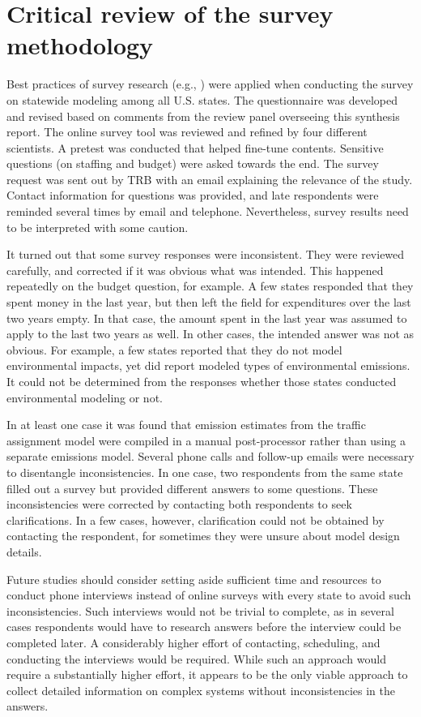 \section{Critical review of the survey methodology}\label{sec:survey-critical-review}

Best practices of survey research (e.g., \cite{babbie11}) were applied when conducting the survey on statewide modeling among all U.S. states. The questionnaire was developed and revised based on comments from the review panel overseeing this synthesis report. The online survey tool was reviewed and refined by four different scientists. A pretest was conducted that helped fine-tune contents. Sensitive questions (on staffing and budget) were asked towards the end. The survey request was sent out by TRB with an email explaining the relevance of the study. Contact information for questions was provided, and late respondents were reminded several times by email and telephone. Nevertheless, survey results need to be interpreted with some caution.

It turned out that some survey responses were inconsistent. They were reviewed carefully, and corrected if it was obvious what was intended. This happened repeatedly on the budget question, for example. A few states responded that they spent money in the last year, but then left the field for expenditures over the last two years empty. In that case, the amount spent in the last year was assumed to apply to the last two years as well. In other cases, the intended answer was not as obvious. For example, a few states reported that they do not model environmental impacts, yet did report modeled types of environmental emissions. It could not be determined from the responses whether those states conducted environmental modeling or not. 

In at least one case it was found that emission estimates from the traffic assignment model were compiled in a manual post-processor rather than using a separate emissions model. Several phone calls and follow-up emails were necessary to disentangle inconsistencies. In one case, two respondents from the same state filled out a survey but provided different answers to some questions. These inconsistencies were corrected by contacting both respondents to seek clarifications. In a few cases, however, clarification could not be obtained by contacting the respondent, for sometimes they were unsure about model design details.

Future studies should consider setting aside sufficient time and resources to conduct phone interviews instead of online surveys with every state to avoid such inconsistencies. Such interviews would not be trivial to complete, as in several cases respondents would have to research answers before the interview could be completed later. A considerably higher effort of contacting, scheduling, and conducting the interviews would be required. While such an approach would require a substantially higher effort, it appears to be the only viable approach to collect detailed information on complex systems without inconsistencies in the answers.

